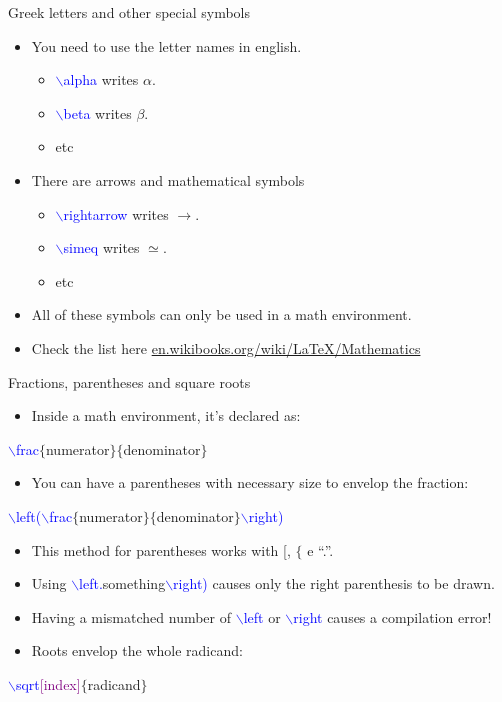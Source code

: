 \documentclass[usenames,dvipsnames,aspectratio=169]{beamer}
\newcommand{\aitem}{\item[$\cdot$]}
\newcommand{\bitem}{\item[-]}
\begin{document}

\begin{frame}[t]{Greek letters and other special symbols}
\begin{itemize}
\aitem You need to use the letter names in english.
\begin{itemize}
\bitem \textcolor{blue}{$\backslash$alpha} writes $\alpha$.
\bitem \textcolor{blue}{$\backslash$beta} writes $\beta$.
\bitem etc
\end{itemize}
\aitem There are arrows and mathematical symbols
\begin{itemize}
\bitem \textcolor{blue}{$\backslash$rightarrow} writes $\rightarrow$.
\bitem \textcolor{blue}{$\backslash$simeq} writes $\simeq$.
\bitem etc
\end{itemize}
\aitem All of these symbols can only be used in a math environment.
\aitem Check the list here \textcolor{blue}{\url{en.wikibooks.org/wiki/LaTeX/Mathematics}}
\end{itemize}
\end{frame}


\begin{frame}[t]{Fractions, parentheses and square roots}
\begin{itemize}
\aitem Inside a math environment, it's declared as:
\end{itemize}
\textcolor{blue}{$\backslash$frac}\textcolor{PineGreen}{$\{$numerator$\}$}\textcolor{PineGreen}{$\{$denominator$\}$}
\begin{itemize}
\aitem You can have a parentheses with necessary size to envelop the fraction:
\end{itemize}
\textcolor{blue}{$\backslash$left(}\textcolor{blue}{$\backslash$frac}\textcolor{PineGreen}{$\{$numerator$\}$}\textcolor{PineGreen}{$\{$denominator$\}$}\textcolor{blue}{$\backslash$right)}
\begin{itemize}
\aitem This method for parentheses works with [, $\{$ e ``.''.
\aitem Using \textcolor{blue}{$\backslash$left.}\textcolor{PineGreen}{something}\textcolor{blue}{$\backslash$right)} causes only the right parenthesis to be drawn.
\aitem Having a mismatched number of \textcolor{blue}{$\backslash$left} or \textcolor{blue}{$\backslash$right} causes a compilation error!
\aitem Roots envelop the whole radicand:
\end{itemize}
\textcolor{blue}{$\backslash$sqrt}\textcolor{purple}{[index]}\textcolor{PineGreen}{$\{$radicand$\}$}
\end{frame}
\end{document}
